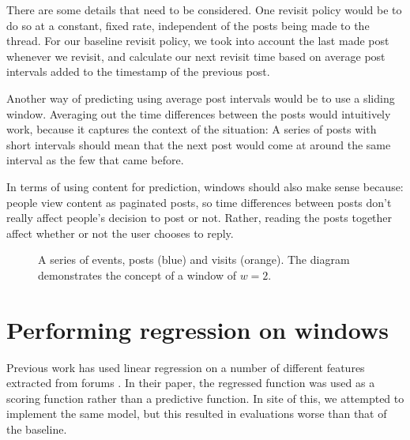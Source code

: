There are some details that need to be considered. One revisit policy would be 
to do so at a constant, fixed rate, independent of the posts being made to the 
thread. 
For our baseline revisit policy, we took into account the last made post 
whenever we revisit, and calculate our next revisit time based on average post 
intervals added to the timestamp of the previous post.

Another way of predicting using average post intervals would be to use a sliding 
window. Averaging out the time differences between the posts would intuitively 
work, because it captures the context of the situation: A series of posts with 
short intervals should mean that the next post would come at around the same 
interval as the few that came before.

In terms of using content for prediction, windows should also make sense 
because:
people view content as paginated posts, so time differences between posts don't 
really affect people's decision to post or not. Rather, reading the posts together
affect whether or not the user chooses to reply.

\begin{figure}
	\begin{center}
	
	\caption{%
A series of events, posts (blue) and visits (orange).  The diagram demonstrates 
the concept of a window of $w=2$.
}\label{fig:event_series}
	\end{center}
\end{figure}

\section{Performing regression on windows}
Previous work has used linear regression on a number of different features 
extracted from forums \cite{Yang2009}. In their paper, the regressed function 
was used as a scoring function rather than a predictive function. In site of 
this, we attempted to implement the same model, but this resulted in evaluations 
worse than that of the baseline.

